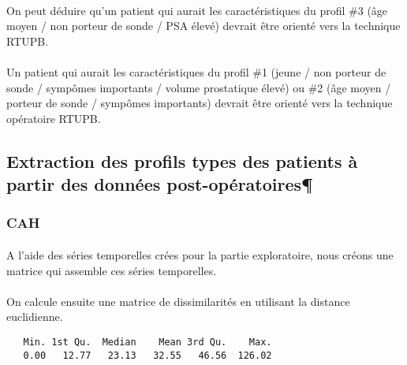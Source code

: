 \documentclass[11pt]{article}
\begin{document}
\paragraph{}
On peut déduire qu'un patient qui aurait les caractéristiques du profil
\#3 (âge moyen / non porteur de sonde / PSA élevé) devrait être orienté
vers la technique RTUPB.
\paragraph{}
Un patient qui aurait les caractéristiques du profil \#1 (jeune / non
porteur de sonde / sympômes importants / volume prostatique élevé) ou
\#2 (âge moyen / porteur de sonde / sympômes importants) devrait être
orienté vers la technique opératoire RTUPB.

    \subsection{Extraction des profils types des patients à partir des
données
post-opératoires¶}\label{extraction-des-profils-types-des-patients-uxe0-partir-des-donnuxe9es-post-opuxe9ratoires}

\subsubsection{CAH}\label{cah}

\paragraph{}A l'aide des séries temporelles crées pour la partie exploratoire, nous
créons une matrice qui assemble ces séries temporelles.
\paragraph{}
On calcule ensuite une matrice de dissimilarités en utilisant la
distance euclidienne.



    
    \begin{verbatim}
   Min. 1st Qu.  Median    Mean 3rd Qu.    Max. 
   0.00   12.77   23.13   32.55   46.56  126.02 
    \end{verbatim}

    


    \begin{center}
    \end{center}
    
\end{document}
